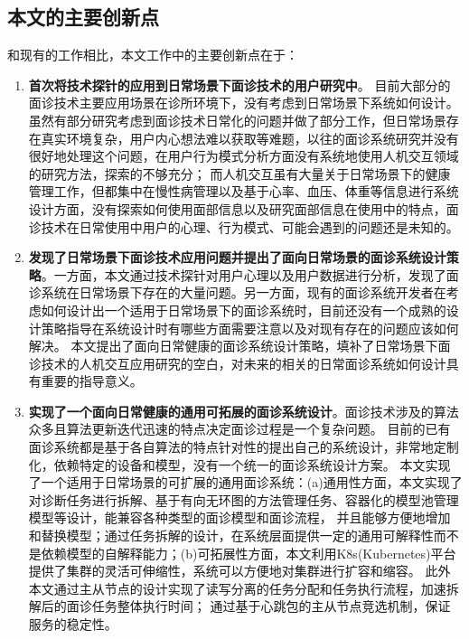 \subsection{本文的主要创新点}
和现有的工作相比，本文工作中的主要创新点在于：
\begin{enumerate}
    \item \textbf{首次将技术探针的应用到日常场景下面诊技术的用户研究中}。
    目前大部分的面诊技术主要应用场景在诊所环境下，没有考虑到日常场景下系统如何设计。
虽然有部分研究考虑到面诊技术日常化的问题并做了部分工作，但日常场景存在真实环境复杂，用户内心想法难以获取等难题，以往的面诊系统研究并没有很好地处理这个问题，在用户行为模式分析方面没有系统地使用人机交互领域的研究方法，探索的不够充分；
而人机交互虽有大量关于日常场景下的健康管理工作，但都集中在慢性病管理以及基于心率、血压、体重等信息进行系统设计方面，没有探索如何使用面部信息以及研究面部信息在使用中的特点，面诊技术在日常使用中用户的心理、行为模式、可能会遇到的问题还是未知的。

\item \textbf{发现了日常场景下面诊技术应用问题并提出了面向日常场景的面诊系统设计策略}。一方面，本文通过技术探针对用户心理以及用户数据进行分析，发现了面诊系统在日常场景下存在的大量问题。另一方面，现有的面诊系统开发者在考虑如何设计出一个适用于日常场景下的面诊系统时，目前还没有一个成熟的设计策略指导在系统设计时有哪些方面需要注意以及对现有存在的问题应该如何解决。
本文提出了面向日常健康的面诊系统设计策略，填补了日常场景下面诊技术的人机交互应用研究的空白\cite{ding2019reading}，对未来的相关的日常面诊系统如何设计具有重要的指导意义。

\item \textbf{实现了一个面向日常健康的通用可拓展的面诊系统设计}。面诊技术涉及的算法众多且算法更新迭代迅速的特点决定面诊过程是一个复杂问题。
    目前的已有面诊系统都是基于各自算法的特点针对性的提出自己的系统设计，非常地定制化，依赖特定的设备和模型，没有一个统一的面诊系统设计方案。
    本文实现了一个适用于日常场景的可扩展的通用面诊系统：(a)通用性方面，本文实现了对诊断任务进行拆解、基于有向无环图的方法管理任务、容器化的模型池管理模型等设计，能兼容各种类型的面诊模型和面诊流程，
            并且能够方便地增加和替换模型；通过任务拆解的设计，在系统层面提供一定的通用可解释性而不是依赖模型的自解释能力；(b)可拓展性方面，本文利用K8s(Kubernetes)平台提供了集群的灵活可伸缩性，系统可以方便地对集群进行扩容和缩容。
            此外本文通过主从节点的设计实现了读写分离的任务分配和任务执行流程，加速拆解后的面诊任务整体执行时间；
            通过基于心跳包的主从节点竞选机制，保证服务的稳定性。
\end{enumerate}

